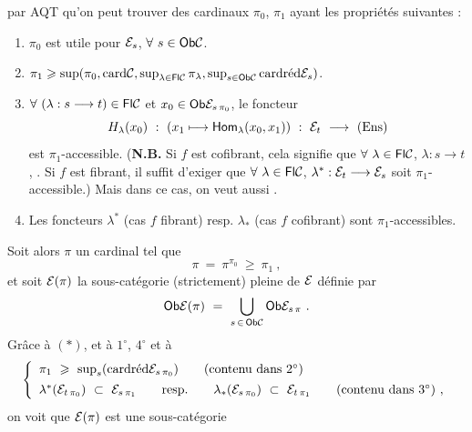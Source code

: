 par AQT qu'on peut trouver des cardinaux $\pi_0$, $\pi_1$ ayant les propriétés suivantes :

\begin{enumerate}
\item[\circled{1\textsuperscript{o}}] $\pi_0$ est utile pour $\cE_s$, $\forall \ s \in \Ob \cC$.
\item[$2^{\circ}$)] $\pi_1 \geqslant \sup(\pi_0, \card \cC, \sup_{\lambda \in \Fl \cC} \pi_{\lambda}, \sup_{s \in \Ob \cC} \card \red \cE_s)$.
\item[\circled{3\textsuperscript{o}}] $\forall \ (\lambda : s \longrightarrow t) \in \Fl \cC$ et $x_0 \in \Ob \cE_{s\,\pi_0}$, le foncteur
\[
H_{\lambda}(x_0) \ : \ (x_1 \longmapsto \Hom_{\lambda}(x_0, x_1)) \ : \ \cE_t \ \longrightarrow \ (\Ens)
\]
est $\pi_1$-accessible. (\textbf{N.B.} Si $f$ est cofibrant, cela signifie que $\forall \ \lambda \in \Fl \cC$, $\lambda : s \longrightarrow t$,
. Si $f$ est fibrant, il suffit d'exiger que $\forall \ \lambda \in \Fl \cC$, $\lambda^* : \cE_t \longrightarrow \cE_s$ %
soit $\pi_1$-accessible.) Mais dans ce cas, on veut aussi . %
\item[\circled{4\textsuperscript{o}}] Les foncteurs $\lambda^*$ (cas $f$ fibrant) resp. $\lambda_*$ (cas $f$ cofibrant) sont $\pi_1$-accessibles.
\end{enumerate}
Soit alors $\pi$ un cardinal tel que
\[
\pi \ = \ \pi^{\pi_0} \ \geqslant \ \pi_1 \ , \tag*{$(*)$}
\]
et soit $\cE(\pi)$ la sous-catégorie (strictement) pleine de $\cE$ définie par
\[
\Ob \cE(\pi) \ = \ \bigcup_{s \, \in \, \Ob \cC} \Ob \cE_{s\,\pi} \ .
\]
Grâce à $(*)$, et à $1^{\circ}$, $4^{\circ}$ et à
\[
\left\{
\begin{array}{l}
\pi_1 \ \geqslant \ \sup_s(\card \red \cE_{s\,\pi_0}) \qquad \text{(contenu dans $2^{\circ}$)} \\[1ex]
\lambda^*(\cE_{t\,\pi_0}) \ \subset \ \cE_{s\,\pi_1} \qquad \text{resp.} \qquad \lambda_*(\cE_{s\,\pi_0}) \ \subset \ \cE_{t\,\pi_1} \qquad \text{(contenu dans $3^{\circ}$)} \ ,
\end{array}
\right.
\]
on voit que $\cE(\pi)$ est une sous-catégorie


